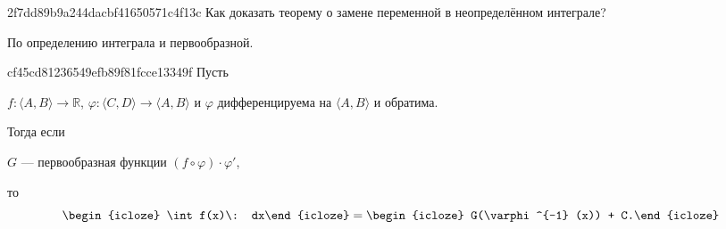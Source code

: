 
\begin{note}{2f7dd89b9a244dacbf41650571c4f13c}
    Как доказать теорему о замене переменной в неопределённом интеграле?

    \begin{cloze}{1}
        По определению интеграла и первообразной.
    \end{cloze}
\end{note}

\begin{note}{cf45cd81236549efb89f81fcce13349f}
    Пусть \begin{icloze}{3}\( f : \langle A, B \rangle \to \mathbb R \), \( \varphi : \langle C, D \rangle \to \langle A, B \rangle \) и \( \varphi \) дифференцируема на \( \langle A, B \rangle \) и обратима.\end{icloze} Тогда если \begin{icloze}{1}\( G \) --- первообразная функции \( \left( f \circ \varphi \right) \cdot \varphi' \),\end{icloze} то
    \[
        \begin{icloze}{2}\int f(x)\: dx\end{icloze} = \begin{icloze}{1}G(\varphi^{-1} (x)) + C.\end{icloze}
    \]
\end{note}

